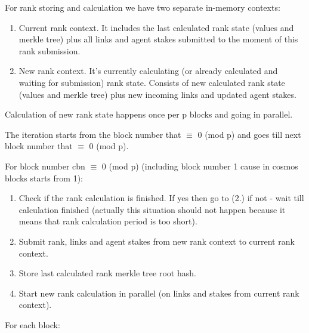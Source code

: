 \documentclass[8pt,oneside]{amsart}
\newcommand{\code}[1]{{\PlayBold #1}}
\begin{document}
For rank storing and calculation we have two separate in-memory contexts:

\begin{enumerate}
\item Current rank context. It includes the last calculated rank state (values and merkle tree) plus
all links and agent stakes submitted to the moment of this rank submission.
\item New rank context. It's currently calculating (or already calculated and waiting for submission) rank state. Consists of new calculated rank state (values and merkle tree) plus new incoming links and updated agent stakes.
\end{enumerate}

Calculation of new rank state happens once per \code{p} blocks and going in parallel.

The iteration starts from the block number that \code{$\equiv$ 0 (mod p)} and goes till next block number that \code{$\equiv$ 0 (mod p)}.

For block number \code{cbn $\equiv$ 0 (mod p)} (including block number 1 cause in cosmos blocks starts from 1):

\begin{enumerate}
  \item Check if the rank calculation is finished. If yes then go to (2.) if not - wait till calculation finished
  (actually this situation should not happen because it means that rank calculation period is too short).
  \item Submit rank, links and agent stakes from new rank context to current rank context.
  \item Store last calculated rank merkle tree root hash.
  \item Start new rank calculation in parallel (on links and stakes from current rank context).
\end{enumerate}

For each block:
\end{document}
